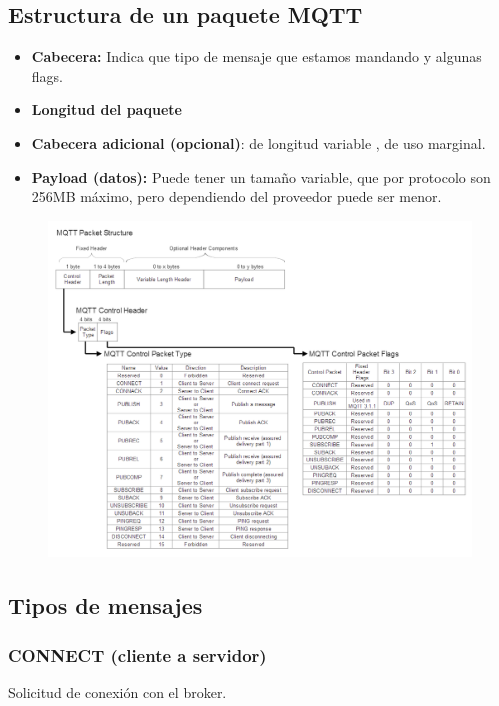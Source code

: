 \documentclass[12pt]{report} %
\begin{document}
\subsection{Estructura de un paquete MQTT}
\begin{itemize}
	\item \textbf{Cabecera:} Indica que tipo de mensaje que estamos mandando y algunas flags.
	\item \textbf{Longitud del paquete} 
	\item \textbf{Cabecera adicional (opcional)}: de longitud variable , de uso marginal. 
	\item \textbf{Payload (datos):} Puede tener un tamaño variable, que por protocolo son 256MB máximo, pero dependiendo del proveedor puede ser menor.
\end{itemize}

\begin{figure}[H]
	{\includegraphics[scale=.5]{f4bd0f8a-2e92-4cdd-abfc-c7b067788d4a.png}}
\end{figure}

\subsection{Tipos de mensajes} 
\subsubsection{CONNECT (cliente a servidor)}
Solicitud de conexión con el broker. 
\end{document}
